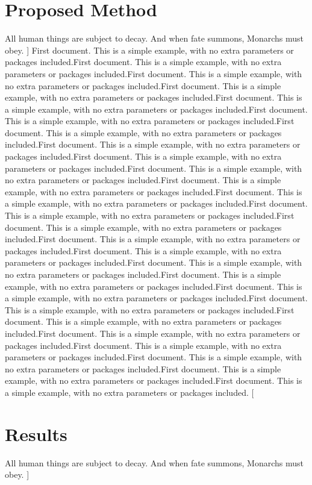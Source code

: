 \documentclass{article}
\begin{document}
\begin{multicols}{2}
\section{Proposed Method}
All human things are subject to decay. And when fate summons, Monarchs must obey.
]
First document. This is a simple example, with no 
extra parameters or packages included.First document. This is a simple example, with no 
extra parameters or packages included.First document. This is a simple example, with no 
extra parameters or packages included.First document. This is a simple example, with no 
extra parameters or packages included.First document. This is a simple example, with no 
extra parameters or packages included.First document. This is a simple example, with no 
extra parameters or packages included.First document. This is a simple example, with no 
extra parameters or packages included.First document. This is a simple example, with no 
extra parameters or packages included.First document. This is a simple example, with no 
extra parameters or packages included.First document. This is a simple example, with no 
extra parameters or packages included.First document. This is a simple example, with no 
extra parameters or packages included.First document. This is a simple example, with no 
extra parameters or packages included.First document. This is a simple example, with no 
extra parameters or packages included.First document. This is a simple example, with no 
extra parameters or packages included.First document. This is a simple example, with no 
extra parameters or packages included.First document. This is a simple example, with no 
extra parameters or packages included.First document. This is a simple example, with no 
extra parameters or packages included.First document. This is a simple example, with no 
extra parameters or packages included.First document. This is a simple example, with no 
extra parameters or packages included.First document. This is a simple example, with no 
extra parameters or packages included.First document. This is a simple example, with no 
extra parameters or packages included.First document. This is a simple example, with no 
extra parameters or packages included.First document. This is a simple example, with no 
extra parameters or packages included.First document. This is a simple example, with no 
extra parameters or packages included.First document. This is a simple example, with no 
extra parameters or packages included.First document. This is a simple example, with no 
extra parameters or packages included.
[
\section{Results}
All human things are subject to decay. And when fate summons, Monarchs must obey.
]


\end{multicols}
\end{document}
